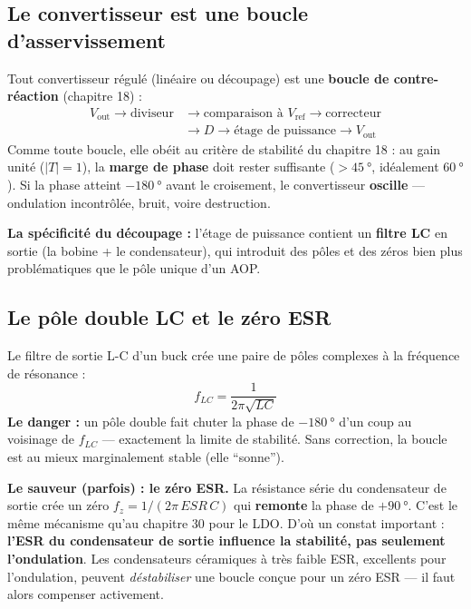 \documentclass[12pt,a4paper,twoside]{book}
\begin{document}
\subsection{Le convertisseur est une boucle d'asservissement}

\begin{formule}
Tout convertisseur régulé (linéaire ou découpage) est une \textbf{boucle de contre-réaction} (chapitre 18) :
\[
\begin{aligned}
V_{\text{out}} \to \text{diviseur} &\to \text{comparaison à } V_{\text{ref}} \to \text{correcteur} \\
&\to D \to \text{étage de puissance} \to V_{\text{out}}
\end{aligned}
\]
Comme toute boucle, elle obéit au critère de stabilité du chapitre 18 : au gain unité ($|T| = 1$), la \textbf{marge de phase} doit rester suffisante ($> \SI{45}{°}$, idéalement $\SI{60}{°}$). Si la phase atteint $-\SI{180}{°}$ avant le croisement, le convertisseur \textbf{oscille} --- ondulation incontrôlée, bruit, voire destruction.

\textbf{La spécificité du découpage :} l'étage de puissance contient un \textbf{filtre LC} en sortie (la bobine + le condensateur), qui introduit des pôles et des zéros bien plus problématiques que le pôle unique d'un AOP.
\end{formule}

\subsection{Le pôle double LC et le zéro ESR}

\begin{formule}
Le filtre de sortie L-C d'un buck crée une paire de pôles complexes à la fréquence de résonance :
\[
f_{LC} = \frac{1}{2\pi\sqrt{LC}}
\]
\textbf{Le danger :} un pôle double fait chuter la phase de \textbf{$-\SI{180}{°}$} d'un coup au voisinage de $f_{LC}$ --- exactement la limite de stabilité. Sans correction, la boucle est au mieux marginalement stable (elle ``sonne'').

\textbf{Le sauveur (parfois) : le zéro ESR.} La résistance série du condensateur de sortie crée un zéro $f_z = 1/(2\pi\,ESR\,C)$ qui \textbf{remonte} la phase de $+\SI{90}{°}$. C'est le même mécanisme qu'au chapitre 30 pour le LDO. D'où un constat important : \textbf{l'ESR du condensateur de sortie influence la stabilité, pas seulement l'ondulation}. Les condensateurs céramiques à très faible ESR, excellents pour l'ondulation, peuvent \textit{déstabiliser} une boucle conçue pour un zéro ESR --- il faut alors compenser activement.
\end{formule}
\end{document}
